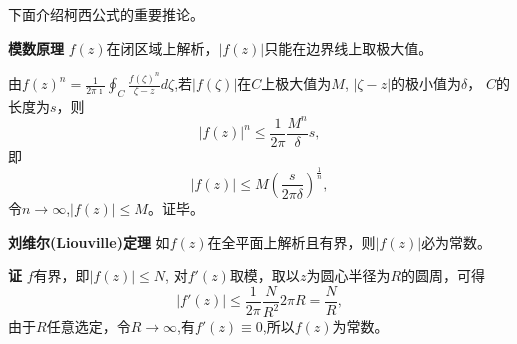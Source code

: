 下面介绍柯西公式的重要推论。

\textbf{模数原理} $f(z)$在闭区域上解析，$|f(z)|$只能在边界线上取极大值。

由$f(z)^n = \frac{1}{2\pi \imath} \oint_C \frac{f(\zeta)^n}{\zeta - z} d \zeta$,若$|f(\zeta)|$在$C$上极大值为$M$,
$|\zeta - z|$的极小值为$\delta$， $C$的长度为$s$，则
\[
  |f(z)|^n \leq \frac{1}{2\pi} \frac{M^n}{\delta} s  ,
\]
即
\[
    |f(z)| \leq M \left( \frac{s}{2\pi \delta} \right)^{\frac{1}{n}},
\]
令$n\to \infty$,$|f(z)| \leq M$。证毕。

\textbf{刘维尔(Liouville)定理} \quad 如$f(z)$在全平面上解析且有界，则$|f(z)|$必为常数。

\textbf{证} \quad $f$有界，即$|f(z)| \leq N$, 对$f'(z)$取模，取以$z$为圆心半径为$R$的圆周，可得
\[
  |f'(z)| \leq \frac{1}{2\pi} \frac{N} {R^2} 2\pi R = \frac{N}{R},
\]
由于$R$任意选定，令$R\to \infty$,有$f'(z) \equiv 0$,所以$f(z)$为常数。